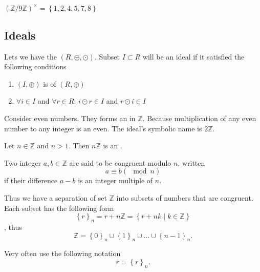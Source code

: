 \begin{appendices}
\begin{example}
  $\left(\mathbb{Z}/9\mathbb{Z}\right)^\times =
  \left\{1,2,4,5,7,8\right\}$ \cite{wiki:multiplicativegroup}
  \label{ex:multiplicativegroup}
\end{example}

\subsection{Ideals}

\begin{definition}[Ideal]
  Lets we have the 
  $\left(R, \oplus, \odot\right)$. Subset $I \subset R$ will be an
  ideal if it satisfied the following conditions
  \begin{enumerate}
  \item $\left(I, \oplus\right)$ is  of
    $\left(R, \oplus\right)$
  \item $\forall i \in I$ and $\forall r \in R$:
    $i \odot r \in I$ and $r \odot i \in I$
  \end{enumerate}
  \label{def:ideal}
\end{definition}

\begin{example}
  Consider even numbers. They forms an  in
  $\mathbb{Z}$. Because multiplication of any even number to any
  integer is an even. The ideal's symbolic name is $2 \mathbb{Z}$.
  \label{ex:ideal}
\end{example}

\begin{example}
  Let $n \in \mathbb{Z}$ and $n > 1$. Then $n \mathbb{Z}$ is an
  .

  Two integer $a, b \in \mathbb{Z}$  are said to be congruent modulo
  $n$, written
  \[
  a \equiv b ( \mod n )
  \]
  if their difference $a - b$ is an integer multiple of $n$.

  Thus we have a separation of set $\mathbb{Z}$ into subsets of
  numbers that are congruent. Each subset has the following form
  \[
  \left\{r\right\}_n = r + n \mathbb{Z} =
  \left\{r + n k \mid k \in \mathbb{Z}\right\}
  \],
  thus
  \[
  \mathbb{Z} = \left\{0\right\}_n \cup \left\{1\right\}_n
  \cup \dots \cup \left\{n-1\right\}_n.
  \]

  Very often use the following notation
  \[
  \bar{r} = \left\{r\right\}_n.
  \]


\end{example}
\end{appendices}
